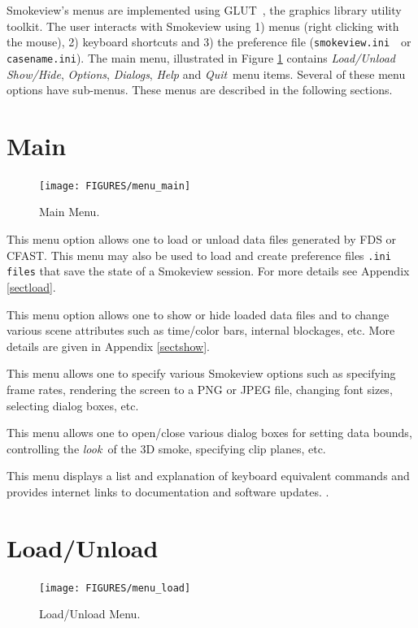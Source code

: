 \documentclass[11pt,twoside]{book}
\newcommand{\svini}{{\tt smokeview.ini}\ }
\newcommand{\parma}{.75}
\newcommand{\parmb}{.5}
\newcommand{\parmc}{0.25}
\newcommand{\blist}{
\begin{list}
{}{
\setlength{\leftmargin}{\parma in}
\setlength{\labelwidth}{\parmb in}
\setlength{\labelsep}{\parmc in}
\setlength{\listparindent}{0.3in}
\setlength{\topsep}{.3in}
\setlength{\parsep}{.0in}
}}
\newcommand{\elist}{\end{list}}
\newcommand{\hitem}[1]{\item[{\bf #1} \hfill]}
\begin{document}
Smokeview's menus are implemented using GLUT~\cite{OpenGLGlut},
the graphics library utility toolkit. The user interacts with
Smokeview using 1) menus (right clicking with the mouse), 2)
keyboard shortcuts and 3) the preference file (\svini\ or {\tt
casename.ini}).  The main menu, illustrated in Figure
\ref{fig_mainmenu} contains {\em Load/Unload}\ \, {\em Show/Hide},
{\em Options}, {\em Dialogs}, {\em Help} and {\em Quit}\ menu
items. Several of these menu options have sub-menus. These menus
are described in the following sections.

\section{Main}

\begin{figure}[\figoptions]
\begin{center}
\texttt{[image: FIGURES/menu\_main]}
\caption{Main Menu.} \label{fig_mainmenu}
\end{center}
\end{figure}

\blist

\hitem{Load/Unload}This menu option allows one to load or unload
data files generated by FDS or CFAST.  This menu may also be used
to load and create preference files {\tt .ini files} that save the
state of a Smokeview session. For more details see Appendix
\ref{sectload}.
\\

\hitem{Show/Hide}This menu option allows one to show or hide
loaded data files and to change various scene attributes such as
time/color bars, internal blockages, etc.
More details are given in Appendix \ref{sectshow}.\\

\hitem{Options}This menu allows one to specify various
Smokeview options such as specifying frame rates, rendering
the screen to a PNG or JPEG file, changing font sizes,
selecting dialog boxes, etc.

\hitem{Dialogs}This menu allows one to open/close various dialog
boxes for setting data bounds, controlling the {\em look}\ of the 3D
smoke, specifying clip planes, etc.

\hitem{Help}This menu displays a list and explanation of keyboard
equivalent commands and provides internet links to documentation
and software updates.
. \\

\elist


\section{Load/Unload}
\begin{figure}[\figoptions]
\begin{center}
\texttt{[image: FIGURES/menu\_load]}
\caption{Load/Unload Menu.}
\label{fig_loadmenu}
\end{center}
\end{figure}
\end{document}
